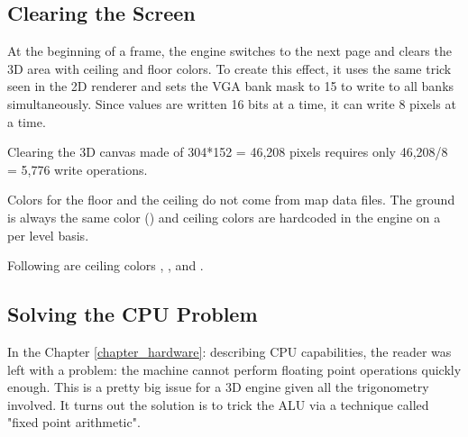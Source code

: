 \subsection{Clearing the Screen}
At the beginning of a frame, the engine switches to the next page and clears the 3D area with ceiling and floor colors. To create this effect, it uses the same trick seen in the 2D renderer and sets the VGA bank mask to 15 to write to all banks simultaneously. Since values are written 16 bits at a time, it can write 8 pixels at a time.\\ 
\par
\begin{minipage}{\textwidth}
 
 \end{minipage}
\par
Clearing the 3D canvas made of 304*152 = 46,208 pixels requires only 46,208/8 = 5,776 write operations.\\
\par
Colors for the floor and the ceiling do not come from map data files. The ground is always the same color () and ceiling colors are hardcoded in the engine on a per level basis.\\
\par
\begin{minipage}{\textwidth}
 
 \end{minipage}
\par


Following are ceiling colors , ,  and .\\ 
\par
{}












\subsection{Solving the CPU Problem}

In the Chapter \ref{chapter_hardware}: \pageref{chapter_hardware} describing CPU capabilities, the reader was left with a problem: the machine cannot perform floating point operations quickly enough. This is a pretty big issue for a 3D engine given all the trigonometry involved. It turns out the solution is to trick the ALU via a technique called "fixed point arithmetic".







